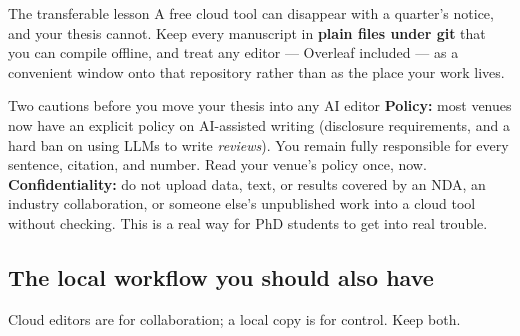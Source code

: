 \documentclass[11pt,a4paper]{article}
\begin{document}
\begin{cbox}{The transferable lesson}
A free cloud tool can disappear with a quarter's notice, and your thesis
cannot. Keep every manuscript in \textbf{plain  files under git}
that you can compile offline, and treat any editor --- Overleaf included ---
as a convenient window onto that repository rather than as the place your work
lives.
\end{cbox}

\begin{wbox}{Two cautions before you move your thesis into any AI editor}
\textbf{Policy:} most venues now have an explicit policy on AI-assisted
writing (disclosure requirements, and a hard ban on using LLMs to write
\emph{reviews}). You remain fully responsible for every sentence, citation,
and number. Read your venue's policy once, now.\\[4pt]
\textbf{Confidentiality:} do not upload data, text, or results covered by an
NDA, an industry collaboration, or someone else's unpublished work into a
cloud tool without checking. This is a real way for PhD students to get into
real trouble.
\end{wbox}

\subsection{The local workflow you should also have}

Cloud editors are for collaboration; a local copy is for control. Keep both.
\end{document}
